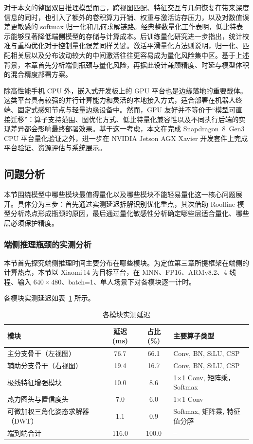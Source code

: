 对于本文的整图双目推理模型而言，跨视图匹配、特征交互与几何恢复在带来深度信息的同时，也引入了额外的卷积算力开销、权重与激活访存压力，以及对数值误差更敏感的 softmax 归一化和几何求解链路。经典整数量化工作表明，低比特表示能够显著降低端侧模型的存储与计算成本。后训练量化研究进一步指出，统计校准与重构优化对于控制量化误差同样关键。激活平滑量化方法则说明，归一化、匹配相关层以及分布波动较大的中间激活往往更容易成为量化风险集中区。基于上述背景，本章首先分析端侧瓶颈与量化风险，再据此设计兼顾精度、时延与模型体积的混合精度部署方案。

除高性能手机 CPU 外，嵌入式开发板上的 GPU 平台也是边缘落地的重要载体。这类平台具有较强的并行计算能力和灵活的本地接入方式，适合部署在机器人终端、固定式感知节点与轻量边缘设备中。然而，GPU 友好并不等价于“模型可直接迁移”：算子支持范围、图优化方式、低比特量化兼容性以及不同执行后端的实现差异都会影响最终部署效果。基于这一考虑，本文在完成 Snapdragon~8~Gen3 CPU 平台量化验证之外，进一步在 NVIDIA Jetson AGX Xavier 开发套件上完成平台验证、资源评估与系统展示。

\subsection{问题分析}

本节围绕模型中哪些模块最值得量化以及哪些模块不能轻易量化这一核心问题展开。具体分为三步：首先通过实测延迟拆解识别优化重点，其次借助 Roofline 模型分析热点形成瓶颈的原因，最后通过量化敏感性分析确定哪些层适合量化、哪些层必须保护精度。

\subsubsection{端侧推理瓶颈的实测分析}

本节首先探究端侧推理时间主要分布在哪些模块。为定位第三章所提框架在端侧的计算热点，本节以 Xiaomi\,14 为目标平台，在 MNN、FP16、ARMv8.2、4 线程、输入 $640\times480$、batch=1、单人场景下对各模块逐一计时。

各模块实测延迟如表~\ref{tab:module_latency} 所示。

\begin{table}[htbp]
  \centering
  \small
  \caption{各模块实测延迟}
  \label{tab:module_latency}
  \begin{tabular}{lccl}
    \toprule
    模块 & 延迟 (ms) & 占比 (\%) & 主要算子类型 \\
    \midrule
主分支骨干（左视图） & 76.7 & 66.1 & Conv, BN, SiLU, CSP \\
辅助分支骨干（右视图） & 19.4 & 16.7 & Conv, BN, SiLU, CSP \\
    极线特征增强模块            & 10.0 &  8.6 & 1$\times$1 Conv, 矩阵乘，Softmax \\
    热力图头与置信度头                   &  7.0 &  6.0 & 1$\times$1 Conv \\
    可微加权三角化姿态求解器（DWT）&  1.1 &  0.9 & Softmax, 矩阵乘, 特征值分解 \\
    \midrule
    端到端合计                           & 116.0 & 100.0 & -- \\
    \bottomrule
  \end{tabular}
\end{table}

